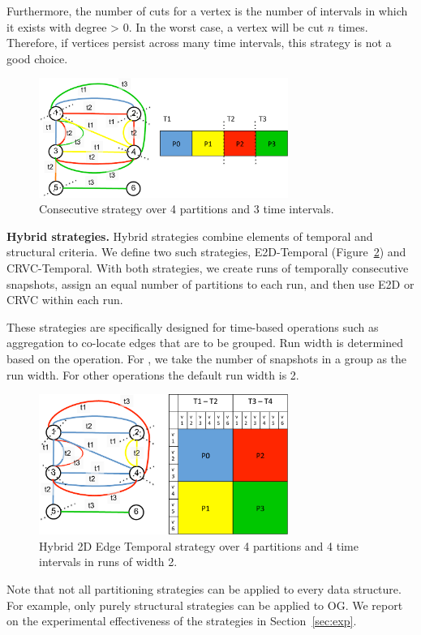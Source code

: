 Furthermore, the number of cuts for a vertex is the number of
intervals in which it exists with degree > 0.  In the worst case, a
vertex will be cut $n$ times.  Therefore, if vertices persist across
many time intervals, this strategy is not a good choice.

\begin{figure}[t!]
\includegraphics[width=3.2in]{figs/Consecutive.pdf}
\caption{Consecutive strategy over 4 partitions and 3 time intervals.}
\label{fig:consecutive}
\end{figure}

{\bf Hybrid strategies.} Hybrid strategies combine elements of
temporal and structural criteria.  We define two such strategies,
E2D-Temporal (Figure~\ref{fig:hybrid2d}) and CRVC-Temporal.  With both
strategies, we create runs of temporally consecutive snapshots, assign
an equal number of partitions to each run, and then use E2D or CRVC
within each run.

These strategies are specifically designed for time-based operations
such as aggregation to co-locate edges that are to be grouped.  Run
width is determined based on the operation.  For , we
take the number of snapshots in a group as the run width.  For other
operations the default run width is 2.

\begin{figure}[t!]
\includegraphics[width=3.2in]{figs/Hybrid2D.pdf}
\caption{Hybrid 2D Edge Temporal strategy over 4 partitions and 4 time
  intervals in runs of width 2.}
\label{fig:hybrid2d}
\end{figure}

Note that not all partitioning strategies can be applied to every data
structure.  For example, only purely structural strategies can be
applied to OG.  We report on the experimental effectiveness of the
strategies in Section~\ref{sec:exp}.


